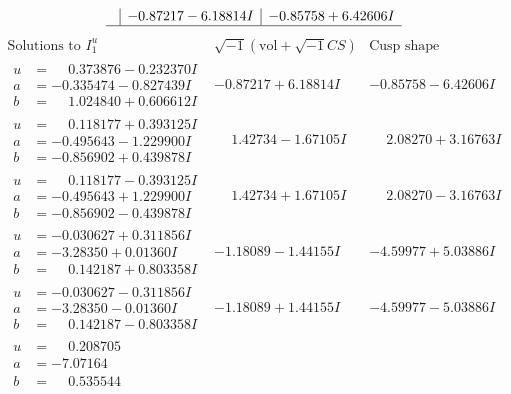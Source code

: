 \documentclass[1p]{elsarticle_modified}
\theoremstyle{definition}
\newcommand{\I}{\sqrt{-1}}
\begin{document}
$$\begin{array}{c|c|c}
 & -0.87217 - 6.18814 I & -0.85758 + 6.42606 I\\
 \hline 
 \end{array}$$\newpage$$\begin{array}{c|c|c}  
\text{Solutions to }I^u_{1}& \I (\text{vol} + \sqrt{-1}CS) & \text{Cusp shape}\\
 \hline 
\begin{aligned}
u &= \phantom{-}0.373876 - 0.232370 I \\
a &= -0.335474 - 0.827439 I \\
b &= \phantom{-}1.024840 + 0.606612 I\end{aligned}
 & -0.87217 + 6.18814 I & -0.85758 - 6.42606 I \\ \hline\begin{aligned}
u &= \phantom{-}0.118177 + 0.393125 I \\
a &= -0.495643 - 1.229900 I \\
b &= -0.856902 + 0.439878 I\end{aligned}
 & \phantom{-}1.42734 - 1.67105 I & \phantom{-}2.08270 + 3.16763 I \\ \hline\begin{aligned}
u &= \phantom{-}0.118177 - 0.393125 I \\
a &= -0.495643 + 1.229900 I \\
b &= -0.856902 - 0.439878 I\end{aligned}
 & \phantom{-}1.42734 + 1.67105 I & \phantom{-}2.08270 - 3.16763 I \\ \hline\begin{aligned}
u &= -0.030627 + 0.311856 I \\
a &= -3.28350 + 0.01360 I \\
b &= \phantom{-}0.142187 + 0.803358 I\end{aligned}
 & -1.18089 - 1.44155 I & -4.59977 + 5.03886 I \\ \hline\begin{aligned}
u &= -0.030627 - 0.311856 I \\
a &= -3.28350 - 0.01360 I \\
b &= \phantom{-}0.142187 - 0.803358 I\end{aligned}
 & -1.18089 + 1.44155 I & -4.59977 - 5.03886 I \\ \hline\begin{aligned}
u &= \phantom{-}0.208705\phantom{ +0.000000I} \\
a &= -7.07164\phantom{ +0.000000I} \\
b &= \phantom{-}0.535544\phantom{ +0.000000I}\end{aligned}

\end{array}$$
\end{document}
